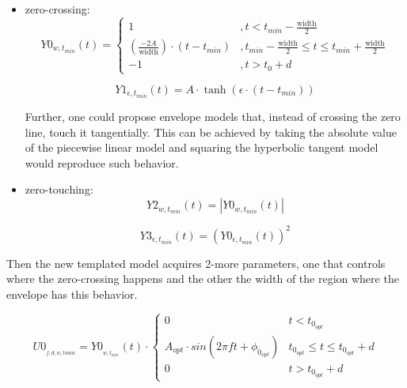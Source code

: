 \vspace{1cm}

\begin{itemize}
\item zero-crossing:
\begin{equation}\label{line}
Y0_{w, t_{min}}(t) =
\begin{cases} 
      1 &, t<t_{min}-\mathrm{\frac{width}{2}} \\
      \left( \frac{-2A}{\mathrm{width}} \right) \cdot (t- t_{min}) &, t_{min}-\mathrm{\frac{width}{2}} \leq t \leq t_{min}+\mathrm{\frac{width}{2}} \\
     -1 &, t>t_{0}+d
   \end{cases}
\end{equation}

\begin{equation}\label{tanh}
Y1_{\epsilon, t_{min}}(t) = A \cdot \tanh (\epsilon \cdot(t-t_{min}))
\end{equation}

Further, one could propose envelope models that, instead of crossing the zero line, touch it tangentially. This can be achieved by taking the absolute value of the piecewise linear model and squaring the hyperbolic tangent model would reproduce such behavior.


\item zero-touching:
\begin{equation}\label{line-abs}
Y2_{w, t_{min}}(t) = \left| Y0_{w, t_{min}}(t) \right|
\end{equation}

\begin{equation}\label{tanh2}
Y3_{\epsilon, t_{min}}(t) = \left( Y0_{\epsilon, t_{min}}(t) \right)^2
\end{equation}

\end{itemize}

Then the new templated model acquires 2-more parameters, one that controls where the zero-crossing happens and the other the width of the region where the envelope has this behavior.

\begin{equation}\label{4dim-model}
U0_{_{f,d, w, tmin}} = Y0_{_{w,t_{min}}}(t) \cdot
\begin{cases} 
      0 & t<t_{0_{opt}} \\
      A_{opt} \cdot sin(2\pi f t + \phi_{0_{opt}}) & t_{0_{opt}} \leq t\leq t_{0_{opt}}+d \\
      0 & t>t_{0_{opt}}+d
   \end{cases}
\end{equation}


